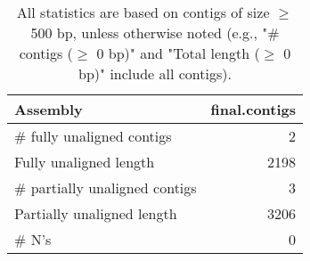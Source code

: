 \documentclass[12pt,a4paper]{article}
\begin{document}
\begin{table}[ht]
\begin{center}
\caption{All statistics are based on contigs of size $\geq$ 500 bp, unless otherwise noted (e.g., "\# contigs ($\geq$ 0 bp)" and "Total length ($\geq$ 0 bp)" include all contigs).}
\begin{tabular}{|l*{1}{|r}|}
\hline
Assembly & final.contigs \\ \hline
\# fully unaligned contigs & 2 \\ \hline
Fully unaligned length & 2198 \\ \hline
\# partially unaligned contigs & 3 \\ \hline
Partially unaligned length & 3206 \\ \hline
\# N's & 0 \\ \hline
\end{tabular}
\end{center}
\end{table}
\end{document}
